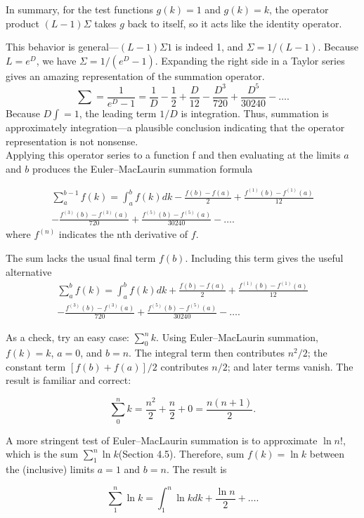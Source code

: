 \documentclass[fleqn]{book}
\begin{document}
In summary, for the test functions $g(k) = 1$ and $g(k) = k$, the operator
product $(L − 1)\Sigma$ takes $g$ back to itself, so it acts like the identity operator.

\newpage

\pagestyle{fancy}

\renewcommand{\headrulewidth}{0pt}
\fancyhf{}


\noindent \Large This behavior is general---$(L-1)\Sigma 1$ is indeed 1, and $\Sigma=1/(L-1)$. Because $L=e^D$, we have $\Sigma=1/(e^D-1)$. Expanding the right side in a Taylor
series gives an amazing representation of the summation operator.
\begin{equation}
\sum=\frac{1}{e^D-1}=\frac{1}{D}-\frac{1}{2}+\frac{D}{12}-\frac{D^3}{720}+\frac{D^5}{30240}-\dots. 
\end{equation}
Because $D\int=1$, the leading term $1/D$ is integration. Thus, summation is approximately integration—a plausible conclusion indicating that the operator representation is not nonsense.\\

\noindent Applying this operator series to a function f and then evaluating at the limits $a$ and $b$ produces the Euler–MacLaurin summation formula

\begin{eqnarray}
\sum_a^{b-1}f(k)=\int_a^b f(k)dk-\frac{f(b)-f(a)}{2}+\frac{f^{(1)}(b)-f^{(1)}(a)}{12}\nonumber \\
-\frac{f^{(3)}(b)-f^{(3)}(a)}{720}+\frac{f^{(5)}(b)-f^{(5)}(a)}{30240}-\dots.
\end{eqnarray}
where $f^{(n)}$ indicates the nth derivative of $f$.
\vspace{0.2cm}

\noindent The sum lacks the usual final term $f(b)$. Including this term gives the useful alternative 
\begin{eqnarray}
\sum_a^{b}f(k)=\int_a^b f(k)dk+\frac{f(b)-f(a)}{2}+\frac{f^{(1)}(b)-f^{(1)}(a)}{12}\nonumber\\
-\frac{f^{(3)}(b)-f^{(3)}(a)}{720}+\frac{f^{(5)}(b)-f^{(5)}(a)}{30240}-\dots. 
\end{eqnarray}


\noindent As a check, try an easy case: $\sum_0^n k$. Using Euler–MacLaurin summation, $f(k)=k$, $a=0$, and $b=n$. The integral term then contributes $n^2/2$; the constant term $[f(b)+f(a)]/2$ contributes $n/2$; and later terms vanish. The result is familiar and correct:

\begin{equation}
\sum_0^n k=\frac{n^2}{2}+\frac{n}{2}+0=\frac{n(n+1)}{2}.
\end{equation}

\noindent A more stringent test of Euler–MacLaurin summation is to approximate $\ln{n!}$, which is the sum $\sum_1^n\ln k$(Section 4.5). Therefore, sum $f(k)=\ln k$ between the (inclusive) limits $a=1$ and $b=n$. The result is

\begin{equation}
\sum_1^n\ln k=\int_1^n\ln k dk+\frac{\ln n}{2}+\dots.
\end{equation}
\end{document}
